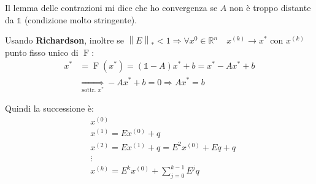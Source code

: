 \documentclass{article}
\begin{document}
Il lemma delle contrazioni mi dice che ho convergenza se $A$ non è troppo distante da $\mathbb 1$ (condizione molto stringente).

Usando \textbf{Richardson}, inoltre se $\left\|E\right\|_\ast<1\Rightarrow\forall x^0\in\mathbb R^n\quad x^{(k)}\to x^\ast$ con $x^{(k)}$ punto fisso
unico di $\operatorname{F}$:
\begin{align*}
    x^\ast & =\operatorname{F}\left(x^\ast\right)=\left(\mathbb 1-A\right)x^\ast+b=x^\ast-Ax^\ast+b \\
           & \underset{\text{sottr. } x^\ast}{\Rightarrow} -Ax^\ast+b=0\Rightarrow Ax^\ast=b
\end{align*}

Quindi la successione è:
\begin{align*}
     & x^{(0)}                                 \\
     & x^{(1)}=Ex^{(0)}+q                      \\
     & x^{(2)}=Ex^{(1)}+q=E^2x^{(0)}+Eq+q      \\
     & \vdots                                  \\
     & x^{(k)}=E^kx^{(0)}+\sum_{j=0}^{k-1}E^jq
\end{align*}
\end{document}
